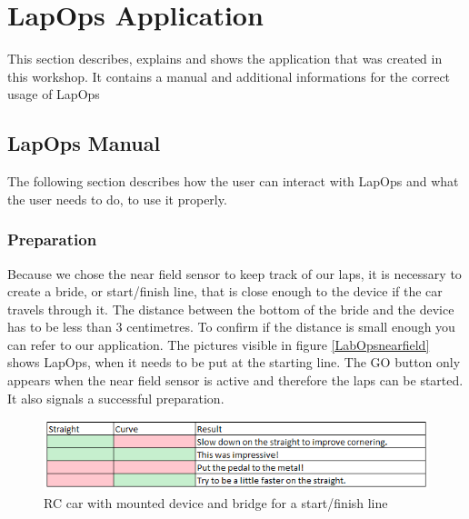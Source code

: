 \chapter{LapOps Application}
This section describes, explains and shows the application that was created in this workshop. It contains a manual and additional informations for the correct usage of LapOps

\section{LapOps Manual}
The following section describes how the user can interact with LapOps and what the user needs to do, to use it properly.

\subsection{Preparation}\label{prep}
Because we chose the near field sensor to keep track of our laps, it is necessary to create a bride, or start/finish line, that is close enough to the device if the car travels through it. The distance between the bottom of the bride and the device has to be less than 3 centimetres. To confirm if the distance is small enough you can refer to our application. The pictures visible in figure \ref{LabOpsnearfield} shows LapOps, when it needs to be put at the starting line. The GO button only appears when the near field sensor is active and therefore the laps can be started. It also signals a successful preparation.

\begin{figure}[H]
	\centering
	\includegraphics[scale= 0.9]{Pictures/StraightResultMapping.png}
	\caption{RC car with mounted device and bridge for a start/finish line}
	\label{startFinishLineWithRC}
\end{figure}

